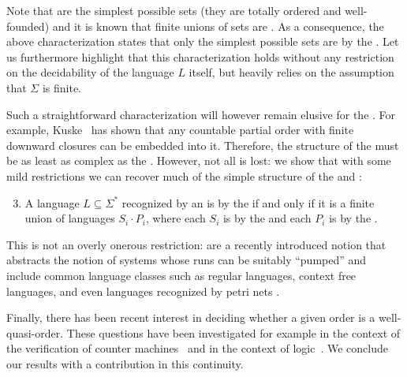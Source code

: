 Note that  are the simplest possible
 sets (they are totally ordered and well-founded) and it
is known that finite unions of  sets are
. As a consequence, the above characterization states
that only the simplest possible  sets are
 by the . Let us furthermore
highlight that this characterization holds without any restriction on the
decidability of the language $L$ itself, but heavily relies on the assumption
that $\Sigma$ is finite. 

Such a straightforward characterization will however remain elusive for the . For example, Kuske~\cite{DBLP:journals/ita/Kuske06} has shown that any countable partial order with finite downward closures can be embedded into it. Therefore, the structure of the  must be as least as complex as the . However, not all is lost: we show that with some mild restrictions we can recover much of the simple structure of the  and :

{
\renewcommand{\labelenumi}{R\arabic{enumi}}
\begin{enumerate}
	\setcounter{enumi}{2}
	\item A language $L \subseteq \Sigma^*$ recognized by an  is  by the  if and only if it is a finite union of languages $S_i \cdot P_i$, where each $S_i$ is  by the  and each $P_i$ is  by the .
\end{enumerate}
}

This is not an overly onerous restriction:  are a recently introduced notion that 
abstracts the notion of systems whose runs can be suitably ``pumped'' and include common language classes such as regular languages,
context free languages, and even languages recognized by petri nets \cite{ASZZ24}. 

Finally, there has been recent interest in deciding whether a given order is a well-quasi-order. These questions have been investigated for example in the context of the verification of counter machines~\cite{DBLP:conf/fsttcs/FinkelG19} and in the context of logic~\cite{DBLP:journals/pacmpl/BergstrasserGLZ24}. We conclude our results with a contribution in this continuity.


